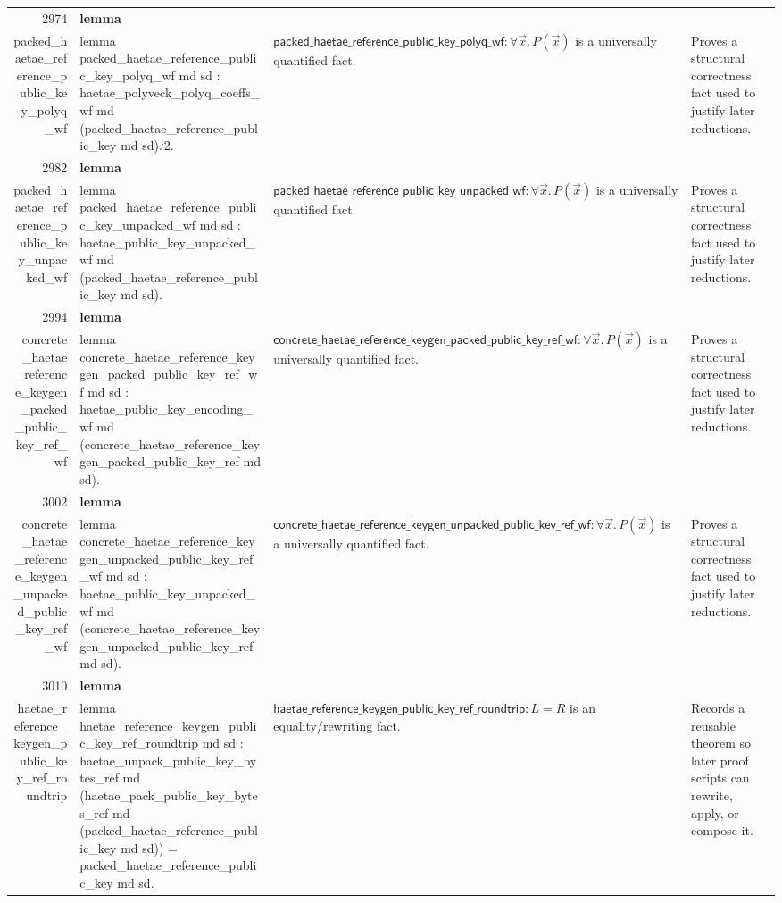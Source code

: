 \documentclass[10pt]{article}
\newcommand{\ec}[1]{\begingroup\ttfamily\scriptsize #1\endgroup}
\begin{document}
\begin{longtable}{r L{0.17\textwidth} L{0.26\textwidth} L{0.27\textwidth} L{0.20\textwidth}}
2974 & \textbf{lemma}\\\ec{packed\_haetae\_reference\_public\_key\_polyq\_wf} & \ec{lemma packed\_haetae\_reference\_public\_key\_polyq\_wf md sd : haetae\_polyveck\_polyq\_coeffs\_wf md (packed\_haetae\_reference\_public\_key md sd).`2.} & \(\mathsf{packed\_haetae\_reference\_public\_key\_polyq\_wf} : \forall \vec{x}.\, P(\vec{x})\) is a universally quantified fact. & Proves a structural correctness fact used to justify later reductions. \\
2982 & \textbf{lemma}\\\ec{packed\_haetae\_reference\_public\_key\_unpacked\_wf} & \ec{lemma packed\_haetae\_reference\_public\_key\_unpacked\_wf md sd : haetae\_public\_key\_unpacked\_wf md (packed\_haetae\_reference\_public\_key md sd).} & \(\mathsf{packed\_haetae\_reference\_public\_key\_unpacked\_wf} : \forall \vec{x}.\, P(\vec{x})\) is a universally quantified fact. & Proves a structural correctness fact used to justify later reductions. \\
2994 & \textbf{lemma}\\\ec{concrete\_haetae\_reference\_keygen\_packed\_public\_key\_ref\_wf} & \ec{lemma concrete\_haetae\_reference\_keygen\_packed\_public\_key\_ref\_wf md sd : haetae\_public\_key\_encoding\_wf md (concrete\_haetae\_reference\_keygen\_packed\_public\_key\_ref md sd).} & \(\mathsf{concrete\_haetae\_reference\_keygen\_packed\_public\_key\_ref\_wf} : \forall \vec{x}.\, P(\vec{x})\) is a universally quantified fact. & Proves a structural correctness fact used to justify later reductions. \\
3002 & \textbf{lemma}\\\ec{concrete\_haetae\_reference\_keygen\_unpacked\_public\_key\_ref\_wf} & \ec{lemma concrete\_haetae\_reference\_keygen\_unpacked\_public\_key\_ref\_wf md sd : haetae\_public\_key\_unpacked\_wf md (concrete\_haetae\_reference\_keygen\_unpacked\_public\_key\_ref md sd).} & \(\mathsf{concrete\_haetae\_reference\_keygen\_unpacked\_public\_key\_ref\_wf} : \forall \vec{x}.\, P(\vec{x})\) is a universally quantified fact. & Proves a structural correctness fact used to justify later reductions. \\
3010 & \textbf{lemma}\\\ec{haetae\_reference\_keygen\_public\_key\_ref\_roundtrip} & \ec{lemma haetae\_reference\_keygen\_public\_key\_ref\_roundtrip md sd : haetae\_unpack\_public\_key\_bytes\_ref md (haetae\_pack\_public\_key\_bytes\_ref md (packed\_haetae\_reference\_public\_key md sd)) = packed\_haetae\_reference\_public\_key md sd.} & \(\mathsf{haetae\_reference\_keygen\_public\_key\_ref\_roundtrip} : L = R\) is an equality/rewriting fact. & Records a reusable theorem so later proof scripts can rewrite, apply, or compose it. \\

\end{longtable}
\end{document}
